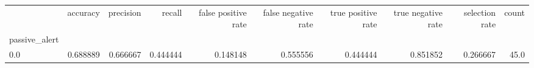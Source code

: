 \begin{tabular}{lrrrrrrrrr}
\toprule
{} &  accuracy &  precision &    recall &  false positive rate &  false negative rate &  true positive rate &  true negative rate &  selection rate &  count \\
passive\_alert &           &            &           &                      &                      &                     &                     &                 &        \\
\midrule
0.0           &  0.688889 &   0.666667 &  0.444444 &             0.148148 &             0.555556 &            0.444444 &            0.851852 &        0.266667 &   45.0 \\
\bottomrule
\end{tabular}
